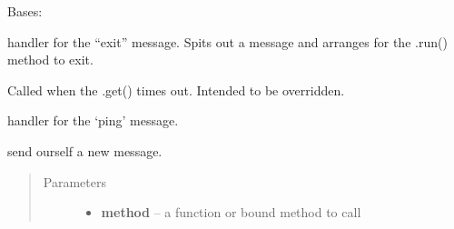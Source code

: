 \documentclass[letterpaper,10pt,english]{sphinxmanual}
\begin{document}

\begin{fulllineitems}
\label{enuActor:enuActor.QThread.QThread}
Bases: 

\begin{fulllineitems}
\label{enuActor:enuActor.QThread.QThread.exitMsg}
handler for the ``exit'' message. Spits out a message and arranges for the .run() method to exit.

\end{fulllineitems}


\begin{fulllineitems}
\label{enuActor:enuActor.QThread.QThread.handleTimeout}
Called when the .get() times out. Intended to be overridden.

\end{fulllineitems}


\begin{fulllineitems}
\label{enuActor:enuActor.QThread.QThread.pingMsg}
handler for the `ping' message.

\end{fulllineitems}


\begin{fulllineitems}
\label{enuActor:enuActor.QThread.QThread.putMsg}
send ourself a new message.
\begin{quote}\begin{description}
\item[{Parameters}] \leavevmode\begin{itemize}
\item {} 
\textbf{method} -- a function or bound method to call


\end{itemize}
\end{description}
\end{quote}
\end{fulllineitems}
\end{fulllineitems}
\end{document}
